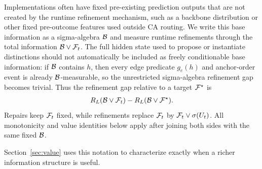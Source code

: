 Implementations often have fixed pre-existing prediction outputs that are not created by the runtime refinement mechanism, such as a backbone distribution or other fixed pre-outcome features used outside CA routing. We write this base information as a sigma-algebra $\mathcal{B}$ and measure runtime refinements through the total information $\mathcal{B}\vee\mathcal{F}_t$. The full hidden state used to propose or instantiate distinctions should not automatically be included as freely conditionable base information: if $\mathcal{B}$ contains $h$, then every edge predicate $g_e(h)$ and anchor-order event is already $\mathcal{B}$-measurable, so the unrestricted sigma-algebra refinement gap becomes trivial. Thus the refinement gap relative to a target $\mathcal{F}^\star$ is
\begin{align*}
R_L(\mathcal{B}\vee\mathcal{F}_t)-R_L(\mathcal{B}\vee\mathcal{F}^\star).
\end{align*}
Repairs keep $\mathcal{F}_t$ fixed, while refinements replace $\mathcal{F}_t$ by $\mathcal{F}_t\vee\sigma(U_t)$. All monotonicity and value identities below apply after joining both sides with the same fixed $\mathcal{B}$.

Section~\ref{sec:value} uses this notation to characterize exactly when a richer information structure is useful.
